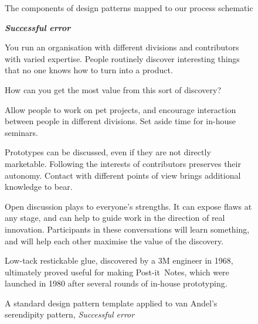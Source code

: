 
\begin{figure}[!h]
\vspace{.3cm}

\vspace{-.3cm}
\caption{The components of design patterns mapped to our process schematic\label{fig:pattern-schematic}}
\end{figure}

\begin{figure}[!h]
{\normalsize
\begin{mdframed}
\vspace{2mm}
\textbf{\emph{Successful error}}~
\begin{description}[leftmargin=0\parindent,labelindent=0em,itemsep=10pt]
\item[{Context.}] You run an organisation with different divisions and
  contributors with varied expertise.  People routinely discover
  interesting things that no one knows how to turn into a product.
\item[{Problem.}]  How can you get the most value from this sort of discovery?
\item[{Solution.}] Allow people to work on pet projects, and encourage
  interaction between people in different divisions.  Set aside time
  for in-house seminars.
\item[{Rationale.}] Prototypes can be discussed, even if they are not
  directly marketable.  Following the interests of contributors
  preserves their autonomy.  Contact with different points of view
  brings additional knowledge to bear.
\item[{Resolution.}] 
Open discussion plays to everyone's strengths.  It can
  expose flaws at any stage, and can help to guide work in the direction of
  real innovation.  Participants in these conversations
  will learn something, and will help each other maximise the value of
  the discovery.  
\item[{Example.}] Low-tack restickable glue, discovered by a 3M
  engineer in 1968, ultimately proved useful for making
  Post-it\texttrademark\ Notes, which were launched in 1980 after
  several rounds of in-house prototyping.
\end{description}
\vspace{-1mm}
\end{mdframed}
}
\caption{A standard design pattern template applied to van Andel's serendipity pattern, \em{Successful error}\label{fig:va-pattern-figure}}
\end{figure}

